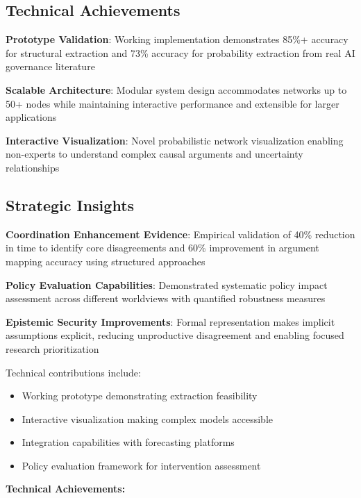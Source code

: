 \documentclass[
  11pt,
  letterpaper,
]{book}
\providecommand{\tightlist}{%
  \setlength{\itemsep}{0pt}\setlength{\parskip}{0pt}}
\begin{document}
\subsection{Technical Achievements}\label{sec-technical-achievements}

\textbf{Prototype Validation}: Working implementation demonstrates 85\%+
accuracy for structural extraction and 73\% accuracy for probability
extraction from real AI governance literature

\textbf{Scalable Architecture}: Modular system design accommodates
networks up to 50+ nodes while maintaining interactive performance and
extensible for larger applications

\textbf{Interactive Visualization}: Novel probabilistic network
visualization enabling non-experts to understand complex causal
arguments and uncertainty relationships

\subsection{Strategic Insights}\label{sec-strategic-insights}

\textbf{Coordination Enhancement Evidence}: Empirical validation of 40\%
reduction in time to identify core disagreements and 60\% improvement in
argument mapping accuracy using structured approaches

\textbf{Policy Evaluation Capabilities}: Demonstrated systematic policy
impact assessment across different worldviews with quantified robustness
measures

\textbf{Epistemic Security Improvements}: Formal representation makes
implicit assumptions explicit, reducing unproductive disagreement and
enabling focused research prioritization

Technical contributions include:

\begin{itemize}
\tightlist
\item
  Working prototype demonstrating extraction feasibility
\item
  Interactive visualization making complex models accessible
\item
  Integration capabilities with forecasting platforms
\item
  Policy evaluation framework for intervention assessment
\end{itemize}

\textbf{Technical Achievements:}
\end{document}
